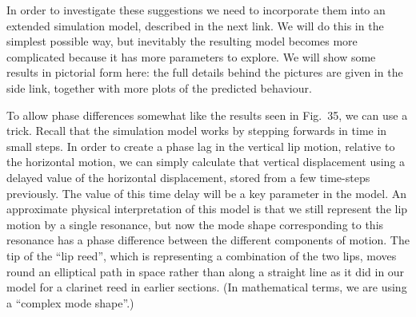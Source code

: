 
  In order to investigate these suggestions we need to incorporate them into an 
  extended simulation model, described in the next link. We will do this in the 
  simplest possible way, but inevitably the resulting model becomes more 
  complicated because it has more parameters to explore. We will show some 
  results in pictorial form here: the full details behind the pictures are 
  given in the side link, together with more plots of the predicted behaviour. 

  To allow phase differences somewhat like the results seen in Fig.\ 35, we can 
  use a trick. Recall that the simulation model works by stepping forwards in 
  time in small steps. In order to create a phase lag in the vertical lip 
  motion, relative to the horizontal motion, we can simply calculate that 
  vertical displacement using a delayed value of the horizontal displacement, 
  stored from a few time-steps previously. The value of this time delay will be 
  a key parameter in the model. An approximate physical interpretation of this 
  model is that we still represent the lip motion by a single resonance, but 
  now the mode shape corresponding to this resonance has a phase difference 
  between the different components of motion. The tip of the “lip reed”, which 
  is representing a combination of the two lips, moves round an elliptical path 
  in space rather than along a straight line as it did in our model for a 
  clarinet reed in earlier sections. (In mathematical terms, we are using a 
  “complex mode shape”.) 










